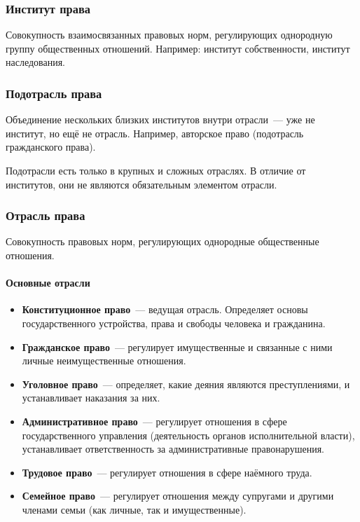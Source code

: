 \documentclass[12pt]{article}
\begin{document}
	\subsubsection{Институт права}
	
	\begin{definition}
		Совокупность взаимосвязанных правовых норм, регулирующих однородную группу общественных отношений. Например: институт собственности, институт наследования.
	\end{definition}
	
	\subsubsection{Подотрасль права}
	
	\begin{definition}
		Объединение нескольких близких институтов внутри отрасли~--- уже не институт, но ещё не отрасль. Например, авторское право (подотрасль гражданского права).
	\end{definition}
	
	\begin{note}
		Подотрасли есть только в крупных и сложных отраслях. В отличие от институтов, они не являются обязательным элементом отрасли.
	\end{note}
	
	\subsubsection{Отрасль права}
	
	\begin{definition}
		Совокупность правовых норм, регулирующих однородные общественные отношения.
	\end{definition}
	
	\paragraph{Основные отрасли}
	
	\begin{itemize}
		\item \textbf{Конституционное право}~--- ведущая отрасль. Определяет основы государственного устройства, права и свободы человека и гражданина.
		\item \textbf{Гражданское право}~--- регулирует имущественные и связанные с ними личные неимущественные отношения.
		\item \textbf{Уголовное право}~--- определяет, какие деяния являются преступлениями, и устанавливает наказания за них.
		\item \textbf{Административное право}~--- регулирует отношения в сфере государственного управления (деятельность органов исполнительной власти), устанавливает ответственность за административные правонарушения.
		\item \textbf{Трудовое право}~--- регулирует отношения в сфере наёмного труда.
		\item \textbf{Семейное право}~--- регулирует отношения между супругами и другими членами семьи (как личные, так и имущественные).
	\end{itemize}
	
\end{document}
